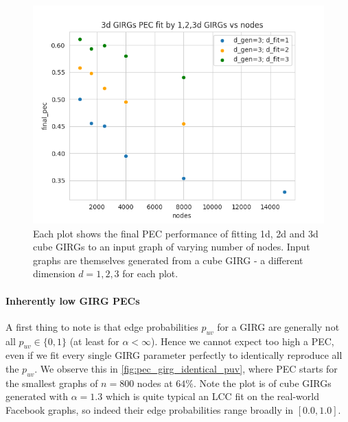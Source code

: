 \begin{figure}
  \parbox[b]{.49\textwidth}{\Large
  \includegraphics[width=\linewidth]{./figures/mcmc_ordered_girggen_d_gen3_pecs.png}
  }
  \hfill
  \parbox[b]{.49\textwidth}{%
  \caption{Each plot shows the final PEC performance of fitting 1d, 2d and 3d cube GIRGs to an input graph of varying number of nodes. Input graphs are themselves generated from a cube GIRG - a different dimension $d=1,2,3$ for each plot.}}

  \label{fig:pec_girggen}
\end{figure}

\paragraph{Inherently low GIRG PECs}
A first thing to note is that edge probabilities $p_{uv}$ for a GIRG are generally not all $p_{uv} \in \{0, 1\}$ (at least for $\alpha < \infty$). Hence we cannot expect too high a PEC, even if we fit every single GIRG parameter perfectly to identically reproduce all the $p_{uv}$. We observe this in \cref{fig:pec_girg_identical_puv}, where PEC starts for the smallest graphs of $n=800$ nodes at $64\%$. Note the plot is of cube GIRGs generated with $\alpha=1.3$ which is quite typical an LCC fit on the real-world Facebook graphs, so indeed their edge probabilities range broadly in $[0.0, 1.0]$.

